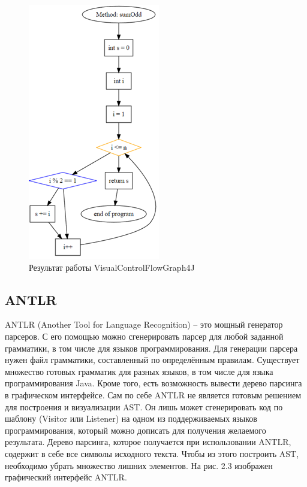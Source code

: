 \begin{figure}[h]
	\center
	\includegraphics [scale=1.1] {my_folder/images/my/11}
	\caption{Результат работы VisualControlFlowGraph4J}
	\label{fig:11}
\end{figure}

\subsection{ANTLR} \label{ch2:subsec-title-abbr}
ANTLR (Another Tool for Language Recognition) – это мощный генератор парсеров. С его помощью можно сгенерировать парсер для любой заданной грамматики, в том числе для языков программирования. Для генерации парсера нужен файл грамматики, составленный по определённым правилам. Существует множество готовых грамматик для разных языков, в том числе для языка программирования Java. Кроме того, есть возможность вывести дерево парсинга в графическом интерфейсе.
Сам по себе ANTLR не является готовым решением для построения и визуализации AST. Он лишь может сгенерировать код по шаблону (Visitor или Listener) на одном из поддерживаемых языков программирования, который можно дописать для получения желаемого результата. Дерево парсинга, которое получается при использовании ANTLR, содержит в себе все символы исходного текста. Чтобы из этого построить AST, необходимо убрать множество лишних элементов. На рис. 2.3 изображен графический интерфейс ANTLR.

